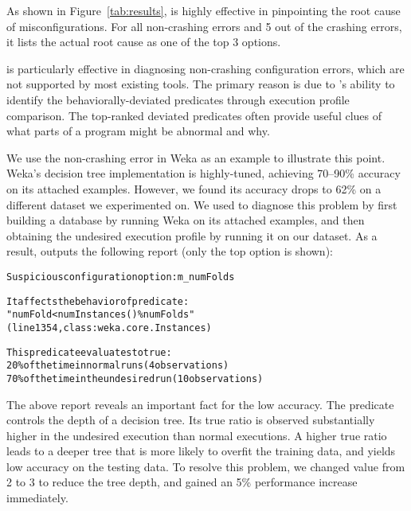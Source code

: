

As shown in Figure~\ref{tab:results},
\ourtool is highly effective in pinpointing the root cause of
misconfigurations. For all \noncrash non-crashing errors
and 5 out of the \crash crashing errors, it lists the actual root cause as one of the top 3 options. 


\ourtool is particularly effective in diagnosing non-crashing configuration errors,
which are not supported by most existing tools. The primary reason is due to
\ourtool's ability to identify the behaviorally-deviated predicates through
execution profile comparison. The top-ranked deviated predicates often provide
useful clues of what parts of a program might be abnormal and why.

We use the non-crashing error in Weka as an example to illustrate
this point. 
Weka's decision tree implementation is highly-tuned, achieving 70--90\% accuracy on
its attached examples. However, we found its accuracy drops to 62\%
on a different dataset we experimented on. We used \ourtool to diagnose this
problem by first building a database by running Weka on its attached examples, and
then
obtaining the undesired execution profile by running it on our dataset. As a result,
\ourtool outputs the following report (only the top option is shown):


\begin{CodeOut}
\begin{alltt} 
  Suspicious configuration option: m\_numFolds

  It affects the behavior of predicate:
  "numFold < numInstances() \% numFolds"
  (line 1354, class: weka.core.Instances) 

  This predicate evaluates to true:
    20\% of the time in normal runs (4 observations)
    70\% of the time in the undesired run (10 observations)

\end{alltt}
\end{CodeOut}

\vspace{-3mm}

The above report reveals an important fact for the low accuracy.
The predicate  controls
the depth of a decision tree. Its
true ratio is observed substantially higher in the undesired execution
than normal executions. A higher true ratio leads
to a deeper tree that is more likely to overfit the training
data, and yields low accuracy on the testing data.
To resolve this problem, we changed 
value from 2 to 3 to reduce the tree depth, and
gained an 5\% performance increase immediately.

